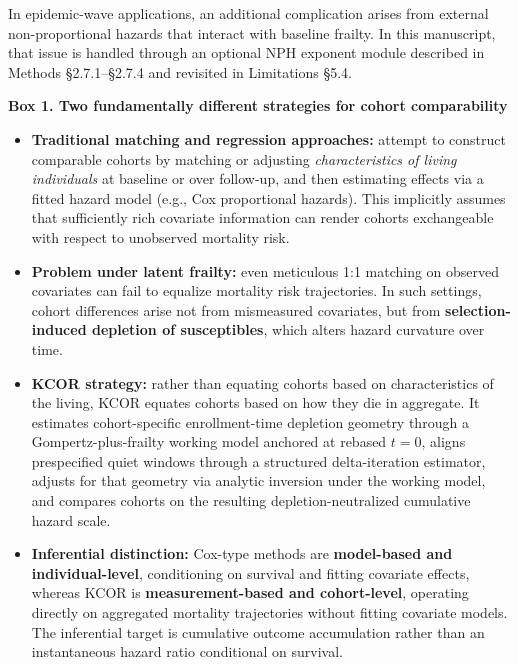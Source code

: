 \documentclass[
]{article}
\renewenvironment{quote}{\begin{mdframed}[style=kcorquote]}{\end{mdframed}}
\begin{document}
In epidemic-wave applications, an additional complication arises from external non-proportional hazards that interact with baseline frailty. In this manuscript, that issue is handled through an optional NPH exponent module described in Methods §2.7.1--§2.7.4 and revisited in Limitations §5.4.

\begin{quote}
\textbf{Box 1. Two fundamentally different strategies for cohort comparability}

\begin{itemize}
\item
  \textbf{Traditional matching and regression approaches:} attempt to construct comparable cohorts by matching or adjusting \emph{characteristics of living individuals} at baseline or over follow-up, and then estimating effects via a fitted hazard model (e.g., Cox proportional hazards). This implicitly assumes that sufficiently rich covariate information can render cohorts exchangeable with respect to unobserved mortality risk.
\item
  \textbf{Problem under latent frailty:} even meticulous 1:1 matching on observed covariates can fail to equalize mortality risk trajectories. In such settings, cohort differences arise not from mismeasured covariates, but from \textbf{selection-induced depletion of susceptibles}, which alters hazard curvature over time.
\item
  \textbf{KCOR strategy:} rather than equating cohorts based on characteristics of the living, KCOR equates cohorts based on how they die in aggregate. It estimates cohort-specific enrollment-time depletion geometry through a Gompertz-plus-frailty working model anchored at rebased \(t=0\), aligns prespecified quiet windows through a structured delta-iteration estimator, adjusts for that geometry via analytic inversion under the working model, and compares cohorts on the resulting depletion-neutralized cumulative hazard scale.
\item
  \textbf{Inferential distinction:} Cox-type methods are \textbf{model-based and individual-level}, conditioning on survival and fitting covariate effects, whereas KCOR is \textbf{measurement-based and cohort-level}, operating directly on aggregated mortality trajectories without fitting covariate models. The inferential target is cumulative outcome accumulation rather than an instantaneous hazard ratio conditional on survival.
\end{itemize}
\end{quote}
\end{document}
